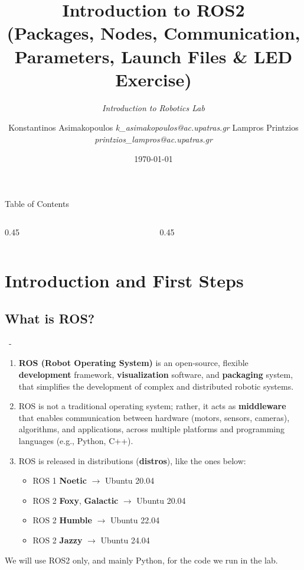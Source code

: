 \documentclass{beamer}
\title{\textbf{Introduction to ROS2 \\ (Packages, Nodes, Communication, Parameters, Launch Files \& LED Exercise)}}
\subtitle{\textit{Introduction to Robotics Lab}}
\author{
    Konstantinos Asimakopoulos \hspace{2em} \textit{k\_asimakopoulos@ac.upatras.gr}
    Lampros Printzios \hspace{2em} \textit{printzios\_lampros@ac.upatras.gr}
}
\institute{Department of Electrical and Computer Engineering \\ University of Patras}
\date{\today}
\begin{document}
\begin{frame}
    \titlepage
\end{frame}

\begin{frame}{Table of Contents}
    \begin{columns}[c]
        \begin{column}{0.45\textwidth}
          \tableofcontents[hideallsubsections, sections={-5}]
        \end{column}
        \begin{column}{0.45\textwidth}
          \tableofcontents[hideallsubsections, sections={6-}]
        \end{column}
    \end{columns}
\end{frame}

\section{Introduction and First Steps}

\subsection{What is ROS?}
\begin{frame}{\insertsection \ - \insertsubsection}
    \begin{enumerate}
        \item \textbf{ROS (Robot Operating System)} is an open-source, flexible \textbf{development} framework, \textbf{visualization} software, and \textbf{packaging} system, that simplifies the development of complex and distributed robotic systems.
        \item ROS is not a traditional operating system; rather, it acts as \textbf{middleware} that enables communication between hardware (motors, sensors, cameras), algorithms, and applications, across multiple platforms and programming languages (e.g., Python, C++).
        \item ROS is released in distributions (\textbf{distros}), like the ones below:
        \begin{itemize}
            \item ROS 1 \textbf{Noetic} $\rightarrow$ Ubuntu 20.04
            \item ROS 2 \textbf{Foxy}, \textbf{Galactic} $\rightarrow$ Ubuntu 20.04
            \item ROS 2 \textbf{Humble} $\rightarrow$ Ubuntu 22.04
            \item ROS 2 \textbf{Jazzy} $\rightarrow$ Ubuntu 24.04
        \end{itemize}
    \end{enumerate}
    We will use ROS2 only, and mainly Python, for the code we run in the lab.
\end{frame}
\end{document}
